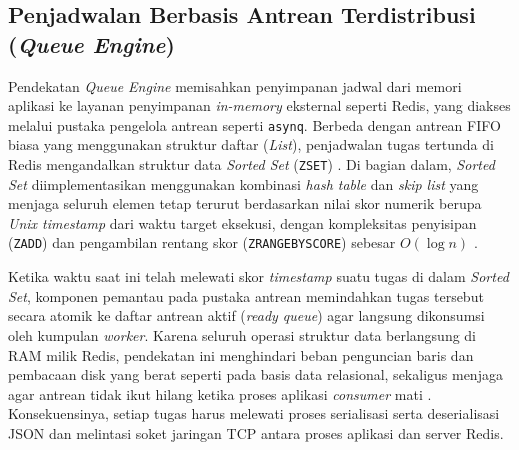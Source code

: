 \subsection{Penjadwalan Berbasis Antrean Terdistribusi (\textit{Queue Engine})} \label{II.Teori_Queue}
Pendekatan \textit{Queue Engine} memisahkan penyimpanan jadwal dari memori aplikasi ke layanan penyimpanan \textit{in-memory} eksternal seperti Redis, yang diakses melalui pustaka pengelola antrean seperti \texttt{asynq}. Berbeda dengan antrean FIFO biasa yang menggunakan struktur daftar (\textit{List}), penjadwalan tugas tertunda di Redis mengandalkan struktur data \textit{Sorted Set} (\texttt{ZSET}) \cite{carlson2013redis}. Di bagian dalam, \textit{Sorted Set} diimplementasikan menggunakan kombinasi \textit{hash table} dan \textit{skip list} yang menjaga seluruh elemen tetap terurut berdasarkan nilai skor numerik berupa \textit{Unix timestamp} dari waktu target eksekusi, dengan kompleksitas penyisipan (\texttt{ZADD}) dan pengambilan rentang skor (\texttt{ZRANGEBYSCORE}) sebesar $O(\log n)$ \cite{carlson2013redis}. \par

Ketika waktu saat ini telah melewati skor \textit{timestamp} suatu tugas di dalam \textit{Sorted Set}, komponen pemantau pada pustaka antrean memindahkan tugas tersebut secara atomik ke daftar antrean aktif (\textit{ready queue}) agar langsung dikonsumsi oleh kumpulan \textit{worker}. Karena seluruh operasi struktur data berlangsung di RAM milik Redis, pendekatan ini menghindari beban penguncian baris dan pembacaan disk yang berat seperti pada basis data relasional, sekaligus menjaga agar antrean tidak ikut hilang ketika proses aplikasi \textit{consumer} mati \cite{maharjan2023benchmarking, levin2024unleashing}. Konsekuensinya, setiap tugas harus melewati proses serialisasi serta deserialisasi JSON dan melintasi soket jaringan TCP antara proses aplikasi dan server Redis. \par

